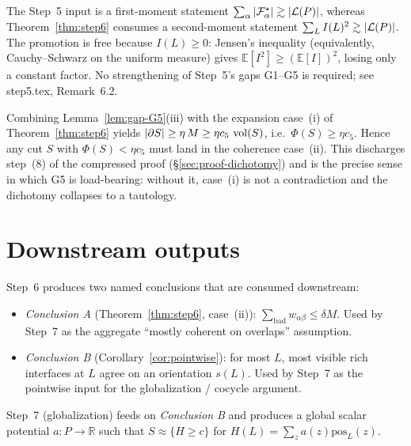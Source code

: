 \begin{remark}\label{rem:G5-why-cs}
The Step~5 input is a first-moment statement
$\sum_\alpha|\mathcal{F}_{\alpha}^\star|\gtrsim|\mathcal{L}(P)|$, whereas
Theorem~\ref{thm:step6} consumes a second-moment statement
$\sum_L I(L)^2\gtrsim|\mathcal{L}(P)|$. The promotion is free because
$I(L)\ge 0$: Jensen's inequality (equivalently, Cauchy--Schwarz on the
uniform measure) gives $\mathbb{E}[I^2]\ge(\mathbb{E}[I])^2$, losing
only a constant factor. No strengthening of Step~5's gaps G1--G5 is
required; see step5.tex, Remark~6.2.
\end{remark}

\begin{remark}\label{rem:G5-closes-dichotomy}
Combining Lemma~\ref{lem:gap-G5}(iii) with the expansion case~(i) of
Theorem~\ref{thm:step6} yields
$|\partial S|\ge\eta\,M\ge\eta c_5\,\operatorname{vol}(S)$, i.e.\ $\Phi(S)\ge\eta c_5$.
Hence any cut $S$ with $\Phi(S)<\eta c_5$ must land in the coherence
case~(ii). This discharges step~(8) of the compressed proof
(§\ref{sec:proof-dichotomy}) and is the precise sense in which G5 is
load-bearing: without it, case~(i) is not a contradiction and the
dichotomy collapses to a tautology.
\end{remark}

\section{Downstream outputs}

Step~6 produces two named conclusions that are consumed downstream:

\begin{itemize}[nosep]
  \item \emph{Conclusion A} (Theorem~\ref{thm:step6}, case~(ii)):
  $\sum_{\text{bad}}w_{\alpha\beta}\le\delta M$.
  Used by Step~7 as the aggregate ``mostly coherent on overlaps''
  assumption.

  \item \emph{Conclusion B} (Corollary~\ref{cor:pointwise}):
  for most $L$, most visible rich interfaces at $L$ agree on an
  orientation $s(L)$.  Used by Step~7 as the pointwise input for the
  globalization / cocycle argument.
\end{itemize}

\noindent
Step~7 (globalization) feeds on \emph{Conclusion B} and produces a
global scalar potential $a\colon P\to\mathbb{R}$ such that
$S\approx\{H\ge c\}$ for $H(L)=\sum_z a(z)\mathrm{pos}_L(z)$.

